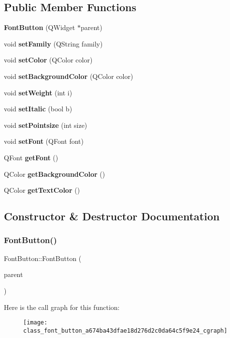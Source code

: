 \subsection*{Public Member Functions}
\begin{DoxyCompactItemize}
\item 
\textbf{ Font\+Button} (Q\+Widget $\ast$parent)
\item 
void \textbf{ set\+Family} (Q\+String family)
\item 
void \textbf{ set\+Color} (Q\+Color color)
\item 
void \textbf{ set\+Background\+Color} (Q\+Color color)
\item 
void \textbf{ set\+Weight} (int i)
\item 
void \textbf{ set\+Italic} (bool b)
\item 
void \textbf{ set\+Pointsize} (int size)
\item 
void \textbf{ set\+Font} (Q\+Font font)
\item 
Q\+Font \textbf{ get\+Font} ()
\item 
Q\+Color \textbf{ get\+Background\+Color} ()
\item 
Q\+Color \textbf{ get\+Text\+Color} ()
\end{DoxyCompactItemize}


\subsection{Constructor \& Destructor Documentation}
\mbox{\label{class_font_button_a674ba43dfae18d276d2c0da64c5f9e24}} 
\subsubsection{Font\+Button()}
{\footnotesize\ttfamily Font\+Button\+::\+Font\+Button (\begin{DoxyParamCaption}\item[{Q\+Widget $\ast$}]{parent }\end{DoxyParamCaption})}

Here is the call graph for this function\+:\nopagebreak
\begin{figure}[H]
\begin{center}
\leavevmode
\texttt{[image: class\_font\_button\_a674ba43dfae18d276d2c0da64c5f9e24\_cgraph]}
\end{center}
\end{figure}


